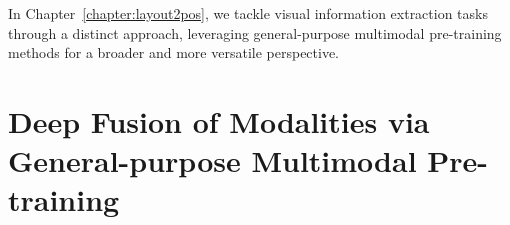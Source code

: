 In Chapter~\ref{chapter:layout2pos}, we tackle visual information extraction tasks through a distinct approach, leveraging general-purpose multimodal pre-training methods for a broader and more versatile perspective.





\section{Deep Fusion of Modalities via General-purpose Multimodal Pre-training}
\label{section:deep-fusion}

